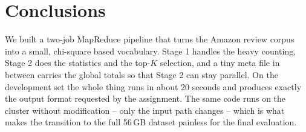 \documentclass[11pt,a4paper]{article}
\begin{document}
\section{Conclusions}

We built a two-job MapReduce pipeline that turns the Amazon review
corpus into a small, chi-square based vocabulary. Stage 1 handles the
heavy counting, Stage 2 does the statistics and the top-$K$ selection,
and a tiny meta file in between carries the global totals so that
Stage 2 can stay parallel. On the development set the whole thing
runs in about 20 seconds and produces exactly the output format
requested by the assignment. The same code runs on the cluster
without modification -- only the input path changes -- which is what
makes the transition to the full 56\,GB dataset painless for the
final evaluation.
\end{document}
